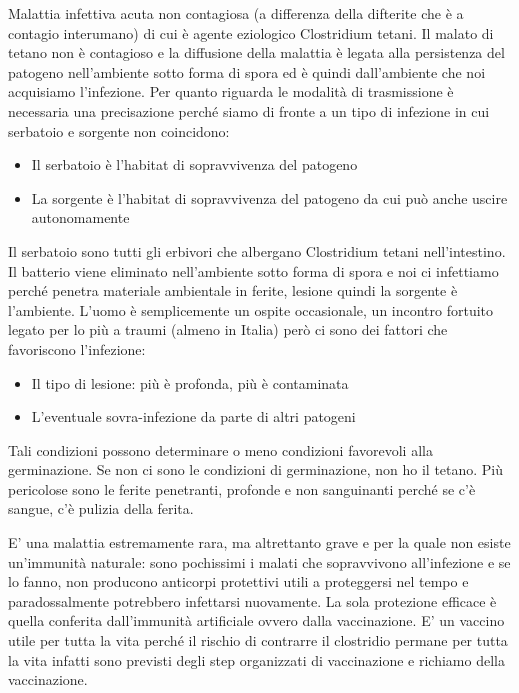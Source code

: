   Malattia infettiva acuta non contagiosa (a differenza della difterite
  che è a contagio interumano) di cui è agente eziologico Clostridium
  tetani. Il malato di tetano non è contagioso e la diffusione della
  malattia è legata alla persistenza del patogeno nell'ambiente sotto
  forma di spora ed è quindi dall'ambiente che noi acquisiamo
  l'infezione. Per quanto riguarda le modalità di trasmissione è
  necessaria una precisazione perché siamo di fronte a un tipo di
  infezione in cui serbatoio e sorgente non coincidono:

\begin{itemize}
\item
  Il serbatoio è l'habitat di sopravvivenza del patogeno
\item
  La sorgente è l'habitat di sopravvivenza del patogeno da cui può anche
  uscire autonomamente
\end{itemize}
  Il serbatoio sono tutti gli erbivori che albergano Clostridium tetani
  nell'intestino. Il batterio viene eliminato nell'ambiente sotto forma
  di spora e noi ci infettiamo perché penetra materiale ambientale in
  ferite, lesione quindi la sorgente è l'ambiente. L'uomo è
  semplicemente un ospite occasionale, un incontro fortuito legato per
  lo più a traumi (almeno in Italia) però ci sono dei fattori che
  favoriscono l'infezione:

\begin{itemize}
\item
  Il tipo di lesione: più è profonda, più è contaminata
\item
  L'eventuale sovra-infezione da parte di altri patogeni
\end{itemize}
  Tali condizioni possono determinare o meno condizioni favorevoli alla
  germinazione. Se non ci sono le condizioni di germinazione, non ho il
  tetano. Più pericolose sono le ferite penetranti, profonde e non
  sanguinanti perché se c'è sangue, c'è pulizia della ferita.

  E' una malattia estremamente rara, ma altrettanto grave e per la quale
  non esiste un'immunità naturale: sono pochissimi i malati che
  sopravvivono all'infezione e se lo fanno, non producono anticorpi
  protettivi utili a proteggersi nel tempo e paradossalmente potrebbero
  infettarsi nuovamente. La sola protezione efficace è quella conferita
  dall'immunità artificiale ovvero dalla vaccinazione. E' un vaccino
  utile per tutta la vita perché il rischio di contrarre il clostridio
  permane per tutta la vita infatti sono previsti degli step organizzati
  di vaccinazione e richiamo della vaccinazione.

